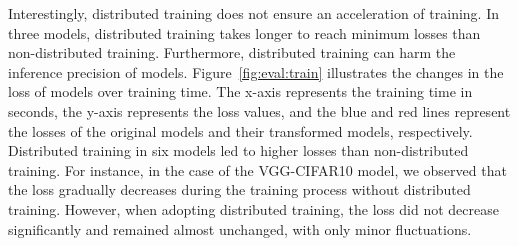 Interestingly, distributed training does not ensure an acceleration of
training.
In three models, distributed training takes longer to reach
minimum losses than non-distributed training.
Furthermore, distributed training can harm the inference precision of models.
Figure~\ref{fig:eval:train} illustrates the changes in the loss of models over
training time. 
The x-axis represents the training time in seconds, the y-axis represents the
loss values, and the blue and red lines represent the losses of the
original models and their transformed models, respectively.
Distributed training in six models led to higher losses than
non-distributed training.
For instance, in the case of the VGG-CIFAR10 model, we observed that the loss
gradually decreases during the training process without distributed training.
However, when adopting distributed training, the loss did not decrease
significantly and remained almost unchanged, with only minor fluctuations.




